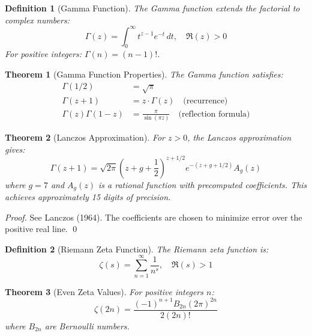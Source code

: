 \documentclass[aps,prd,preprint,superscriptaddress,showpacs,nofootinbib,longbibliography]{revtex4-2}
\newtheorem{theorem}{Theorem}
\newtheorem{definition}{Definition}
\begin{document}
\begin{definition}[Gamma Function]
\label{def:gamma}
The Gamma function extends the factorial to complex numbers:
\begin{equation}
\Gamma(z) = \int_0^\infty t^{z-1} e^{-t} \, dt, \quad \Re(z) > 0
\end{equation}
For positive integers: $\Gamma(n) = (n-1)!$.
\end{definition}

\begin{theorem}[Gamma Function Properties]
\label{thm:gamma_prop}
The Gamma function satisfies:
\begin{align}
\Gamma(1/2) &= \sqrt{\pi} \\
\Gamma(z+1) &= z \cdot \Gamma(z) \quad \text{(recurrence)} \\
\Gamma(z) \Gamma(1-z) &= \frac{\pi}{\sin(\pi z)} \quad \text{(reflection formula)}
\end{align}
\end{theorem}

\begin{theorem}[Lanczos Approximation]
\label{thm:lanczos}
For $z > 0$, the Lanczos approximation gives:
\begin{equation}
\Gamma(z+1) = \sqrt{2\pi} \left(z + g + \frac{1}{2}\right)^{z+1/2} e^{-(z+g+1/2)} A_g(z)
\end{equation}
where $g = 7$ and $A_g(z)$ is a rational function with precomputed coefficients. This achieves approximately 15 digits of precision.
\end{theorem}

\begin{proof}
See Lanczos (1964). The coefficients are chosen to minimize error over the positive real line. \qed
\end{proof}

\begin{definition}[Riemann Zeta Function]
\label{def:zeta}
The Riemann zeta function is:
\begin{equation}
\zeta(s) = \sum_{n=1}^\infty \frac{1}{n^s}, \quad \Re(s) > 1
\end{equation}
\end{definition}

\begin{theorem}[Even Zeta Values]
\label{thm:zeta_even}
For positive integers $n$:
\begin{equation}
\zeta(2n) = \frac{(-1)^{n+1} B_{2n} (2\pi)^{2n}}{2(2n)!}
\end{equation}
where $B_{2n}$ are Bernoulli numbers.
\end{theorem}
\end{document}
